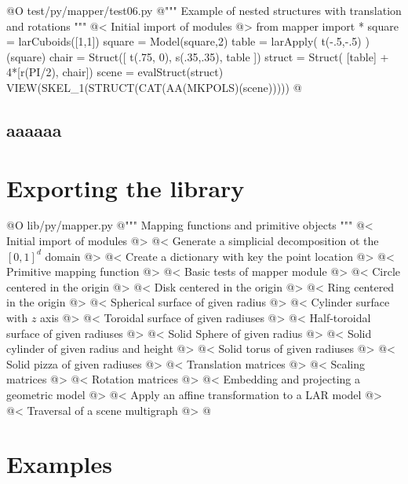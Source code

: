 \documentclass[11pt,oneside]{article}	%
\begin{document}
@O test/py/mapper/test06.py
@{""" Example of nested structures with translation and rotations """
@< Initial import of modules @>
from mapper import *
square = larCuboids([1,1])
square = Model(square,2)
table = larApply( t(-.5,-.5) )(square)
chair = Struct([ t(.75, 0), s(.35,.35), table ])
struct = Struct( [table] + 4*[r(PI/2), chair])
scene = evalStruct(struct)
VIEW(SKEL_1(STRUCT(CAT(AA(MKPOLS)(scene)))))
@}

\subsection{aaaaaa}
\section{Exporting the library}
@O lib/py/mapper.py
@{""" Mapping functions and primitive objects """
@< Initial import of modules @>
@< Generate a simplicial decomposition ot the $[0,1]^d$ domain @>
@< Create a dictionary with key the point location @>
@< Primitive mapping function @>
@< Basic tests of mapper module @>
@< Circle centered in the origin @>
@< Disk centered in the origin @>
@< Ring centered in the origin @>
@< Spherical surface of given radius @>
@< Cylinder surface with $z$ axis @>
@< Toroidal surface of given radiuses @>
@< Half-toroidal surface of given radiuses @>
@< Solid Sphere of given radius @>
@< Solid cylinder of given radius and height @>
@< Solid torus of given radiuses @>
@< Solid pizza of given radiuses @>
@< Translation matrices @>
@< Scaling matrices @>
@< Rotation matrices @>
@< Embedding and projecting a geometric model @>
@< Apply an affine transformation to a LAR model @>
@< Traversal of a scene multigraph @>
@}
\section{Examples}
\end{document}
